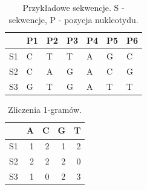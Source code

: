 \documentclass[10pt]{beamer}\usepackage[]{graphicx}\usepackage[]{color}
\begin{document}
\begin{frame}



\begin{table}[ht]
\centering
\begin{tabular}{rllllll}
  \hline
 & P1 & P2 & P3 & P4 & P5 & P6 \\ 
  \hline
S1 & C & T & T & A & G & C \\ 
  S2 & C & A & G & A & C & G \\ 
  S3 & G & T & G & A & T & T \\ 
   \hline
\end{tabular}
\caption{Przykładowe sekwencje.  S - sekwencje, P - pozycja nukleotydu.} 
\end{table}



  
\begin{table}[ht]
\centering
\begin{tabular}{rrrrr}
  \hline
 & A & C & G & T \\ 
  \hline
S1 & 1 & 2 & 1 & 2 \\ 
  S2 & 2 & 2 & 2 & 0 \\ 
  S3 & 1 & 0 & 2 & 3 \\ 
   \hline
\end{tabular}
\caption{Zliczenia 1-gramów.} 
\end{table}


\end{frame}
\end{document}
